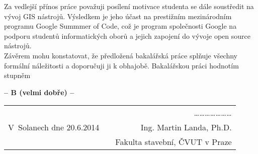 \documentclass[czech,11pt,a4paper]{article}
\begin{document}
Za vedlejší přínos práce považuji posílení motivace studenta se dále
soustředit na vývoj GIS nástrojů. Výsledkem je jeho účast na
prestižním mezinárodním programu Google Summmer of Code, což je
program společnosti Google na podporu studentů informatických oborů a
jejich zapojení do vývoje open source nástrojů.  \\

\newpage
Závěrem mohu konstatovat, že předložená bakalářská práce splňuje
všechny formální náležitosti a doporučuji ji k obhajobě. Bakalářskou
práci hodnotím stupněm

\vskip 2cm

\begin{center}
{\bf -- B (velmi dobře)  --}
\end{center}

\vskip 2cm

\begin{tabular}{lp{}r}
& & \ldots\ldots\ldots\ldots\ldots\ldots\ldots \\
V~Solanech dne 20.6.2014 & & Ing. Martin Landa, Ph.D. \\
& & Fakulta stavební, ČVUT v Praze \\
\end{tabular}
\end{document}
